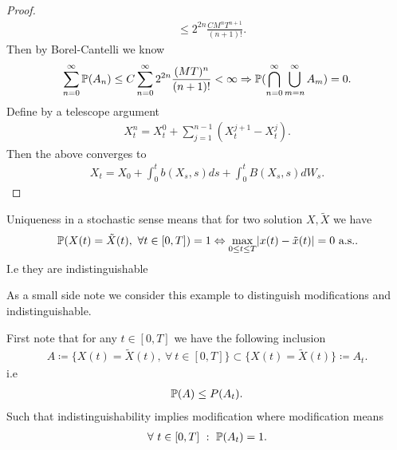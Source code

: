 \begin{proof}
\begin{align*}
                                                                      &\le 2^{2n} \frac{CM^{n}T^{n+1}  }{(n+1)!} 
  .\end{align*}
  Then by Borel-Cantelli we know
  \begin{align*}
    \sum_{n=0}^{\infty} \P(A_n) \le  C \sum_{n=0}^{\infty}2^{2n} \frac{(MT)^{n} }{(n+1)!}    <\infty \implies \P(\bigcap_{n=0}^{\infty} \bigcup_{m=n}^{\infty} A_m ) = 0
   .\end{align*}
   Define by a telescope argument 
   \begin{align*}
     X_t^n = X_t^0 + \sum_{j=1}^{n-1}(X_t^{j+1} - X_t^{j}) 
   .\end{align*}
   Then the above converges to 
   \begin{align*}
     X_t = X_0 + \int_0^{t} b(X_s,s) ds + \int_0^{t} B(X_s,s)  dW_s
   .\end{align*}
\end{proof}
\begin{remark}
 Uniqueness in a stochastic sense means that for two solution $X,\tilde{X} $ we have
 \begin{align*}
   \P(X(t) = \tilde{X}(t), \ \forall  t \in  [0,T] ) = 1 \Leftrightarrow \max_{0\le t \le T} \abs{x(t)-\tilde{x}(t) }  = 0 \text{ a.s.}
 .\end{align*}
 I.e they are indistinguishable 
\end{remark}
As a small side note we consider this example to distinguish modifications and indistinguishable.
\begin{example}
  First note that for any $t \in  [0,T]$  we have the following inclusion 
  \begin{align*}
    A \coloneqq \{X(t)=\tilde{X}(t) ,\ \forall \ t \in  [0,T] \}  \subset  \{X(t) = \tilde{X}(t) \} \coloneqq  A_t   
  .\end{align*}
  i.e 
  \begin{align*}
   \P(A) \le  P(A_t) 
  .\end{align*}
  Such that indistinguishability implies modification where modification means 
  \begin{align*}
    \forall \ t  \in  [0,T] \ : \ \P(A_t) = 1
  .\end{align*}
\end{example}

